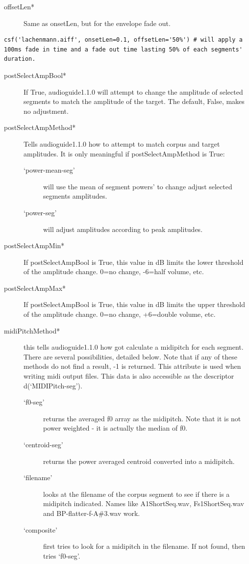 \documentclass{article}
\newcommand{\ag}{audioguide1.1.0\xspace}
\begin{document}
\begin{spacing}{1.2}
\begin{description}
\item[offsetLen*] Same as onsetLen, but for the envelope fade out.

\end{description}
\begin{lstlisting}
csf('lachenmann.aiff', onsetLen=0.1, offsetLen='50%') # will apply a 100ms fade in time and a fade out time lasting 50% of each segments' duration.
\end{lstlisting}
\begin{description}

\item[postSelectAmpBool*] If True, \ag will attempt to change the amplitude of selected segments to match the amplitude of the target.  The default, False, makes no adjustment.
\item[postSelectAmpMethod*] Tells \ag how to attempt to match corpus and target amplitudes.  It is only meaningful if postSelectAmpMethod is True:
\begin{description}
\item[`power-mean-seg'] will use the mean of segment powers' to change adjust selected segments amplitudes.  
\item[`power-seg'] will adjust amplitudes according to peak amplitudes.  
\end{description}
\item[postSelectAmpMin*] If postSelectAmpBool is True, this value in dB limits the lower threshold of the amplitude change.  0=no change, -6=half volume, etc.
\item[postSelectAmpMax*] If postSelectAmpBool is True, this value in dB limits the upper threshold of the amplitude change.  0=no change, +6=double volume, etc.

\item[midiPitchMethod*]\label{midipitchmethod} this tells \ag how got calculate a midipitch for each segment.  There are several possibilities, detailed below.  Note that if any of these methods do not find a result, -1 is returned.  This attribute is used when writing midi output files.  This data is also accessible as the descriptor d(`MIDIPitch-seg').
\begin{description}
\item[`f0-seg'] returns the averaged f0 array as the midipitch.  Note that it is not power weighted - it is actually the median of f0.
\item[`centroid-seg'] returns the power averaged centroid converted into a midipitch.
\item[`filename'] looks at the filename of the corpus segment to see if there is a midipitch indicated.  Names like A1ShortSeq.wav, Fs1ShortSeq.wav and BP-flatter-f-A\#3.wav work.
\item[`composite'] first tries to look for a midipitch in the filename.  If not found, then tries `f0-seg'.
\end{description}


\end{description}
\end{spacing}
\end{document}
